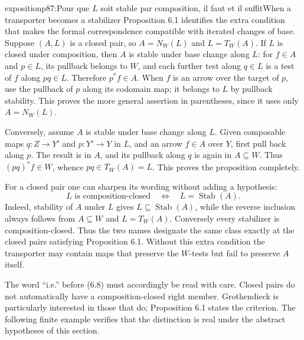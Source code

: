 \begin{dcomment}{exposition}{p87:Pour que $L$ soit stable par composition, il faut et il suffit}{When a transporter becomes a stabilizer}
Proposition 6.1 identifies the extra condition that makes the formal correspondence compatible with iterated changes of base. Suppose $(A,L)$ is a closed pair, so $A=N_W(L)$ and $L=T_W(A)$. If $L$ is closed under composition, then $A$ is stable under base change along $L$: for $f\in A$ and $p\in L$, its pullback belongs to $W$, and each further test along $q\in L$ is a test of $f$ along $pq\in L$. Therefore $p^*f\in A$. When $f$ is an arrow over the target of $p$, use the pullback of $p$ along its codomain map; it belongs to $L$ by pullback stability. This proves the more general assertion in parentheses, since it uses only $A=N_W(L)$.

Conversely, assume $A$ is stable under base change along $L$. Given composable maps $q:Z\to Y'$ and $p:Y'\to Y$ in $L$, and an arrow $f\in A$ over $Y$, first pull back along $p$. The result is in $A$, and its pullback along $q$ is again in $A\subseteq W$. Thus $(pq)^*f\in W$, whence $pq\in T_W(A)=L$. This proves the proposition completely.

For a closed pair one can sharpen its wording without adding a hypothesis:
\[
 L\text{ is composition-closed}
 \quad\Longleftrightarrow\quad
 L=\operatorname{Stab}(A).
\]
Indeed, stability of $A$ under $L$ gives $L\subseteq\operatorname{Stab}(A)$, while the reverse inclusion always follows from $A\subseteq W$ and $L=T_W(A)$. Conversely every stabilizer is composition-closed. Thus the two names designate the same class exactly at the closed pairs satisfying Proposition 6.1. Without this extra condition the transporter may contain maps that preserve the $W$-tests but fail to preserve $A$ itself.

The word ``i.e.'' before (6.8) must accordingly be read with care. Closed pairs do not automatically have a composition-closed right member. Grothendieck is particularly interested in those that do; Proposition 6.1 states the criterion. The following finite example verifies that the distinction is real under the abstract hypotheses of this section.
\end{dcomment}

